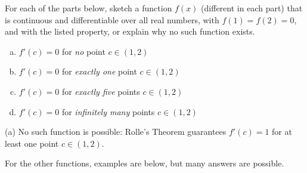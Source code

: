 \begin{Mquestion}
For each of the parts below, sketch a function $f(x)$ (different in each part) that is continuous and differentiable over all real numbers, with $f(1)=f(2)=0$, and with
the listed property, or explain why no such function exists.
\begin{enumerate}[(a)]
\item $f'(c)=0$ for \emph{no} point $c \in (1,2)$
\item $f'(c)=0$ for \emph{exactly one} point $c \in (1,2)$
\item $f'(c)=0$ for \emph{exactly five} points $c \in (1,2)$
\item $f'(c)=0$ for \emph{infinitely many} points $c \in (1,2)$
\end{enumerate}
\end{Mquestion}
\begin{hint}
\end{hint}
\begin{answer}
(a) No such function is possible: Rolle's Theorem guarantees $f'(c)=1$ for at least one point $c \in (1,2)$.

For the other functions, examples are below, but many answers are possible.

\begin{center}
\hfill%
\hfill%
\end{center}
\end{answer}
